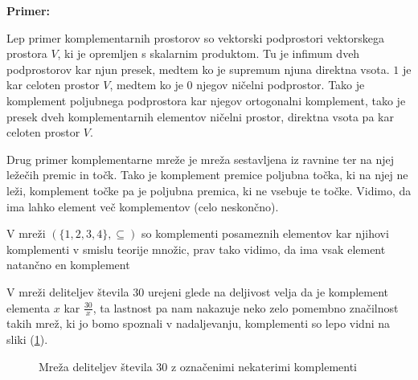 \documentclass[a4paper]{article}
\newcounter{environment:definition_counter}
\newcounter{environment:theorem_counter}
\newcounter{environment:statement_counter}
\newcounter{example:example_counter}
\newenvironment{example}
{\textbf{Primer:}\\}
{\setcounter{example:example_counter}{0}}
\newenvironment{example_case}
{\refstepcounter{example:example_counter} \arabic{example:example_counter}.}
{\\}
\begin{document}
\begin{example}
\begin{example_case}
Lep primer komplementarnih prostorov so vektorski podprostori vektorskega prostora $V$, ki je opremljen s skalarnim produktom. Tu je infimum dveh podprostorov kar njun presek, medtem ko je supremum njuna direktna vsota. $1$ je kar celoten prostor $V$, medtem ko je $0$ njegov ničelni podprostor. Tako je komplement poljubnega podprostora kar njegov ortogonalni komplement, tako je presek dveh komplementarnih elementov ničelni prostor, direktna vsota pa kar celoten prostor $V$.
\end{example_case}
\begin{example_case}
Drug primer komplementarne mreže je mreža sestavljena iz ravnine ter na njej ležečih premic in točk. Tako je komplement premice poljubna točka, ki na njej ne leži, komplement točke pa je poljubna premica, ki ne vsebuje te točke. Vidimo, da ima lahko element več komplementov (celo neskončno).
\end{example_case}
\begin{example_case}
V mreži $(\{1,2,3,4\}, \subseteq)$ so komplementi posameznih elementov kar njihovi komplementi v smislu teorije množic, prav tako vidimo, da ima vsak element natančno en komplement
\end{example_case}
\begin{example_case}
V mreži deliteljev števila $30$ urejeni glede na deljivost velja da je komplement elementa $x$ kar $\frac{30}{x}$, ta lastnost pa nam nakazuje neko zelo pomembno značilnost takih mrež, ki jo bomo spoznali v nadaljevanju, komplementi so lepo vidni na sliki (\ref{im:lattice_30_with_some_complements}).
\end{example_case}
\end{example}

\begin{figure}[h]
  \centering
    \caption{Mreža deliteljev števila $30$ z označenimi nekaterimi komplementi}
    \label{im:lattice_30_with_some_complements}
  \end{figure}  
\newpage
\end{document}

